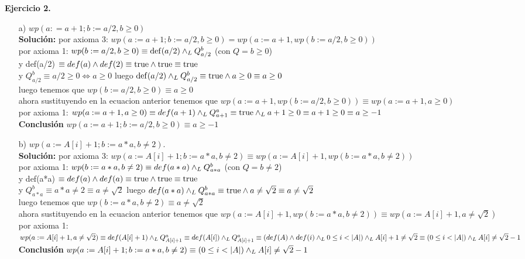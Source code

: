 \documentclass{article}
\begin{document}
\textbf{Ejercicio 2.}\\
\begin{itemize}
	\item [a)] $wp(a: = a + 1; b:= a/2,  b \geq 0)$\\
	\textbf{Soluci\'on:}
	por axioma 3: $wp(a := a+1; b := a/2, b \geq 0) = wp(a := a+1, wp(b := a/2, b \geq 0))$\\
	por axioma 1: $wp(b := a/2, b \geq 0) \equiv \operatorname{def}(a/2) \land _L Q^{b}_{a/2}$ (con $Q = b \geq 0$)\\
	y def(a/2) $\equiv def(a) \land def(2) \equiv \mathrm{true} \land \mathrm{true} \equiv \mathrm{true}$\\
	y $Q^{b}_{a/2} \equiv a/2 \geq 0 \iff a \geq 0$ luego $\operatorname{def}(a/2) \land _L Q^{b}_{a/2} \equiv \mathrm{true} \land a\geq 0 \equiv a \geq 0$\\
	luego tenemos que $wp(b := a/2, b \geq 0) \equiv a \geq 0$\\
	ahora sustituyendo en la ecuacion anterior tenemos que $wp(a := a+1, wp(b := a/2, b \geq 0)) \equiv wp(a := a+1, a \geq 0)$\\
	por axioma 1: $wp(a := a+1, a \geq 0) \equiv def(a+1) \land _L Q^{a}_{a+1} \equiv \mathrm{true} \land _L a+1 \geq 0 \equiv a+1 \geq 0 \equiv a \geq -1$\\
	\textbf{Conclusi\'on} $wp(a := a+1; b := a/2, b \geq 0) \equiv a \geq -1$\\

	\item [b)]$wp(a := A[i] + 1; b := a*a, b \neq 2)$.\\
	\textbf{Soluci\'on:}
	por axioma 3: $wp(a := A[i] + 1; b := a*a, b \neq 2) \equiv wp(a := A[i] + 1, wp(b := a*a, b \neq 2))$\\
	por axioma 1: $wp(b := a*a, b \neq 2) \equiv def(a*a) \land _L Q^{b}_{a*a}$ (con $Q = b \neq 2$)\\
	y def(a*a) $\equiv def(a) \land def(a) \equiv \mathrm{true} \land \mathrm{true} \equiv \mathrm{true}$\\
	y $Q^{b}_{a*a} \equiv a*a \neq 2 \equiv a \neq \sqrt{2}$ luego $def(a*a) \land _L Q^{b}_{a*a} \equiv \mathrm{true} \land a \neq \sqrt{2} \equiv a \neq \sqrt{2}$\\
	luego tenemos que $wp(b := a*a, b \neq 2) \equiv a \neq \sqrt{2}$\\
	ahora sustituyendo en la ecuacion anterior tenemos que $wp(a := A[i] + 1, wp(b := a*a, b \neq 2)) \equiv wp(a := A[i] + 1, a \neq \sqrt{2})$\\
	por axioma 1: $wp(a := A[i] + 1, a \neq \sqrt{2}) \equiv
	def(A[i] + 1) \land _L Q^{a}_{A[i] + 1} \equiv 
	def(A[i]) \land _L Q^{a}_{A[i] + 1} \equiv \\
	(def(A) \land def(i) \land _L 0 \leq i < |A|) \land _L A[i] + 1 \neq \sqrt{2} 
	\equiv (0 \leq i < |A|) \land _L A[i] \neq \sqrt{2} - 1$\\
	\textbf{Conclusi\'on} $wp(a := A[i] + 1; b := a*a, b \neq 2) \equiv (0 \leq i < |A|) \land _L A[i] \neq \sqrt{2} - 1$\\
	

\end{itemize}
\end{document}
